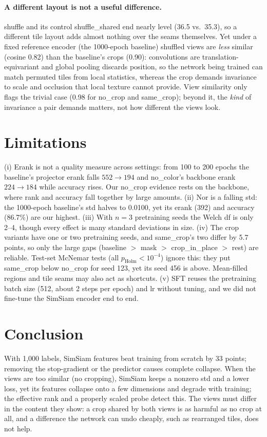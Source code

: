 \documentclass[10pt,twocolumn,letterpaper]{article}
\begin{document}
\paragraph{A different layout is not a useful difference.}
shuffle and its control shuffle\_shared end nearly level (36.5 vs.\ 35.3), so a different tile layout adds almost nothing over the seams themselves.
Yet under a fixed reference encoder (the 1000-epoch baseline) shuffled views are \emph{less} similar (cosine 0.82) than the baseline's crops (0.90): convolutions are translation-equivariant and global pooling discards position, so the network being trained can match permuted tiles from local statistics, whereas the crop demands invariance to scale and occlusion that local texture cannot provide.
View similarity only flags the trivial case (0.98 for no\_crop and same\_crop); beyond it, the \emph{kind} of invariance a pair demands matters, not how different the views look.


\section{Limitations}
\label{sec:limitations}

(i) Erank is not a quality measure across settings: from 100 to 200 epochs the baseline's projector erank falls $552\to194$ and no\_color's backbone erank $224\to184$ while accuracy rises. Our no\_crop evidence rests on the backbone, where rank and accuracy fall together by large amounts.
(ii) Nor is a falling std: the 1000-epoch baseline's std halves to 0.0100, yet its erank (392) and accuracy (86.7\%) are our highest.
(iii) With $n{=}3$ pretraining seeds the Welch df is only 2--4, though every effect is many standard deviations in size.
(iv) The crop variants have one or two pretraining seeds, and same\_crop's two differ by 5.7 points, so only the large gaps (baseline $>$ mask $>$ crop\_in\_place $>$ rest) are reliable. Test-set McNemar tests (all $p_\text{Holm}<10^{-4}$) ignore this: they put same\_crop below no\_crop for seed 123, yet its seed 456 is above. Mean-filled regions and tile seams may also act as shortcuts.
(v) SFT reuses the pretraining batch size (512, about 2 steps per epoch) and lr without tuning, and we did not fine-tune the SimSiam encoder end to end.

\section{Conclusion}
\label{sec:conclusion}
With 1,000 labels, SimSiam features beat training from scratch by 33 points; removing the stop-gradient or the predictor causes complete collapse.
When the views are too similar (no cropping), SimSiam keeps a nonzero std and a lower loss, yet its features collapse onto a few dimensions and degrade with training; the effective rank and a properly scaled probe detect this.
The views must differ in the content they show: a crop shared by both views is as harmful as no crop at all, and a difference the network can undo cheaply, such as rearranged tiles, does not help.

{
    \small
    
    
}
\end{document}
